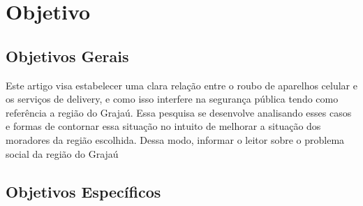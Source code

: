 \section{Objetivo}

    \subsection{Objetivos Gerais}

        Este artigo visa estabelecer uma clara relação entre o roubo de aparelhos 
        celular e os serviços de delivery, e como isso interfere na segurança pública
        tendo como referência a região do Grajaú. Essa pesquisa se desenvolve analisando
        esses casos e formas de contornar  essa situação no intuito de melhorar a 
        situação dos moradores da região  escolhida. Dessa modo, informar o leitor 
        sobre o problema social da região do Grajaú  

    \subsection{Objetivos Específicos}